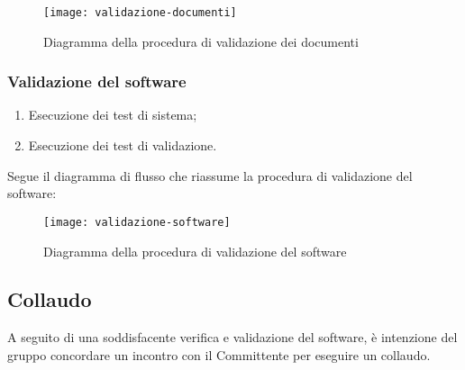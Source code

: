\documentclass[../NormediProgetto.tex]{subfiles}
\begin{document}
\begin{figure}[H]
	\texttt{[image: validazione-documenti]}
	\centering
	\caption{Diagramma della procedura di validazione dei documenti}
\end{figure}

\subsubsection{Validazione del software}

\begin{enumerate}
    \item Esecuzione dei test di sistema;
    
    \item Esecuzione dei test di validazione.
\end{enumerate}
    
Segue il diagramma di flusso che riassume la procedura di validazione del software:

\begin{figure}[H]
	\texttt{[image: validazione-software]}
	\centering
	\caption{Diagramma della procedura di validazione del software}
\end{figure}

\subsection{Collaudo}

A seguito di una soddisfacente verifica e validazione del software, è intenzione del gruppo concordare un incontro con il Committente per eseguire un collaudo.
\end{document}
